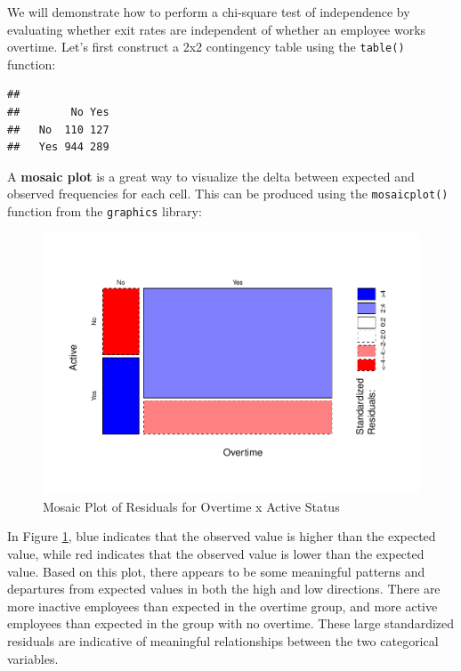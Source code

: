 \documentclass[]{book}
\newenvironment{Shaded}{\begin{snugshade}}{\end{snugshade}}
\newcommand{\CommentTok}[1]{\textcolor[rgb]{0.56,0.35,0.01}{\textit{#1}}}
\newcommand{\KeywordTok}[1]{\textcolor[rgb]{0.13,0.29,0.53}{\textbf{#1}}}
\newcommand{\NormalTok}[1]{#1}
\newcommand{\OperatorTok}[1]{\textcolor[rgb]{0.81,0.36,0.00}{\textbf{#1}}}
\newcommand{\StringTok}[1]{\textcolor[rgb]{0.31,0.60,0.02}{#1}}
\begin{document}
We will demonstrate how to perform a chi-square test of independence by evaluating whether exit rates are independent of whether an employee works overtime. Let's first construct a 2x2 contingency table using the \texttt{table()} function:

\begin{Shaded}
\end{Shaded}

\begin{verbatim}
##      
##        No Yes
##   No  110 127
##   Yes 944 289
\end{verbatim}

A \textbf{mosaic plot} is a great way to visualize the delta between expected and observed frequencies for each cell. This can be produced using the \texttt{mosaicplot()} function from the \texttt{graphics} library:

\begin{figure}

{\centering \includegraphics[width=1\linewidth]{The_People_Analytics_Companion_files/figure-latex/mosaic-plot-1} 

}

\caption{Mosaic Plot of Residuals for Overtime x Active Status}\label{fig:mosaic-plot}
\end{figure}

In Figure \ref{fig:mosaic-plot}, blue indicates that the observed value is higher than the expected value, while red indicates that the observed value is lower than the expected value. Based on this plot, there appears to be some meaningful patterns and departures from expected values in both the high and low directions. There are more inactive employees than expected in the overtime group, and more active employees than expected in the group with no overtime. These large standardized residuals are indicative of meaningful relationships between the two categorical variables.
\end{document}
